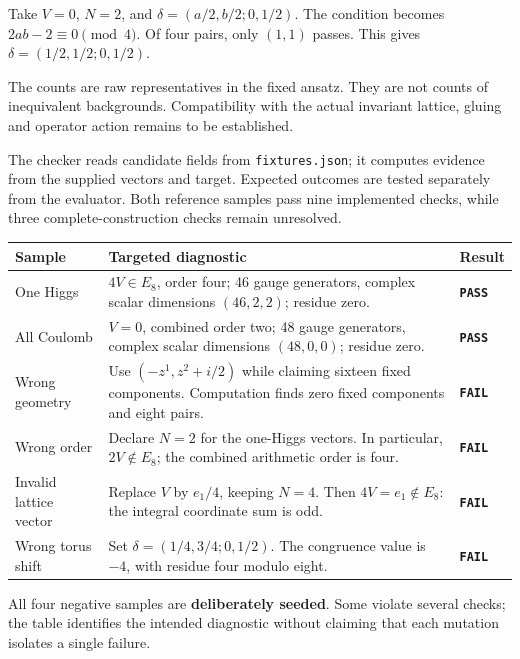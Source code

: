\documentclass[10pt,a4paper]{article}
\newcommand{\sect}[1]{\vspace{7pt}{\fontsize{15}{18}\selectfont #1}\par\vspace{-4pt}{\color{bodyink}\rule{\linewidth}{0.35pt}}\par\vspace{-3pt}}
\newcommand{\subsect}[1]{\vspace{4pt}{\bfseries #1}\par\vspace{-3pt}}
\newcommand{\note}[1]{\par\vspace{4pt}\noindent\colorbox{pale}{\parbox{\dimexpr\linewidth-2\fboxsep\relax}{\small #1}}\par\vspace{4pt}}
\newcommand{\status}[1]{\texttt{\bfseries #1}}
\newcommand{\pagekey}{01}
\newcommand{\pagelabel}{The example}
\newcommand{\pagesummary}{One geometric target.\par One proposed representative.\par Exact, bounded checks.}
\begin{document}
\subsect{All-Coulomb control}
Take \(V=0\), \(N=2\), and \(\delta=(a/2,b/2;0,1/2)\). The condition becomes \(2ab-2\equiv0\pmod4\). Of four pairs, only \((1,1)\) passes. This gives \(\delta=(1/2,1/2;0,1/2)\).

\note{The counts are raw representatives in the fixed ansatz. They are not counts of inequivalent backgrounds. Compatibility with the actual invariant lattice, gluing and operator action remains to be established.}

\newpage
\renewcommand{\pagekey}{04}\renewcommand{\pagelabel}{Sample suite}
\renewcommand{\pagesummary}{Two reference samples.\par Four planted errors.\par Specific checks.}
\sect{Six inputs, evaluated as data}
The checker reads candidate fields from \texttt{fixtures.json}; it computes evidence from the supplied vectors and target. Expected outcomes are tested separately from the evaluator. Both reference samples pass nine implemented checks, while three complete-construction checks remain unresolved.

\begin{center}\small
\begin{tabularx}{\linewidth}{@{}>{\raggedright\arraybackslash}p{28mm}Y>{\raggedright\arraybackslash}p{20mm}@{}}\toprule
\textbf{Sample}&\textbf{Targeted diagnostic}&\textbf{Result}\\\midrule
One Higgs&\(4V\in E_8\), order four; 46 gauge generators, complex scalar dimensions \((46,2,2)\); residue zero.&\status{PASS}\\[3pt]
All Coulomb&\(V=0\), combined order two; 48 gauge generators, complex scalar dimensions \((48,0,0)\); residue zero.&\status{PASS}\\[3pt]
Wrong geometry&Use \((-z^1,z^2+i/2)\) while claiming sixteen fixed components. Computation finds zero fixed components and eight pairs.&\status{FAIL}\\[3pt]
Wrong order&Declare \(N=2\) for the one-Higgs vectors. In particular, \(2V\notin E_8\); the combined arithmetic order is four.&\status{FAIL}\\[3pt]
Invalid lattice vector&Replace \(V\) by \(e_1/4\), keeping \(N=4\). Then \(4V=e_1\notin E_8\): the integral coordinate sum is odd.&\status{FAIL}\\[3pt]
Wrong torus shift&Set \(\delta=(1/4,3/4;0,1/2)\). The congruence value is \(-4\), with residue four modulo eight.&\status{FAIL}\\\bottomrule
\end{tabularx}
\end{center}
All four negative samples are \textbf{deliberately seeded}. Some violate several checks; the table identifies the intended diagnostic without claiming that each mutation isolates a single failure.
\end{document}

